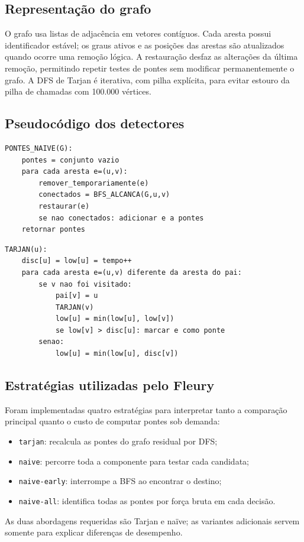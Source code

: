 \documentclass[12pt,a4paper]{article}
\begin{document}
\subsection{Representação do grafo}
O grafo usa listas de adjacência em vetores contíguos. Cada aresta
possui identificador estável; os graus ativos e as posições das arestas
são atualizados quando ocorre uma remoção lógica. A restauração desfaz
as alterações da última remoção, permitindo repetir testes de pontes
sem modificar permanentemente o grafo. A DFS de Tarjan é iterativa,
com pilha explícita, para evitar estouro da pilha de chamadas com
100.000 vértices.

\subsection{Pseudocódigo dos detectores}
\begin{lstlisting}[caption={Detecção de todas as pontes por força bruta.}]
PONTES_NAIVE(G):
    pontes = conjunto vazio
    para cada aresta e=(u,v):
        remover_temporariamente(e)
        conectados = BFS_ALCANCA(G,u,v)
        restaurar(e)
        se nao conectados: adicionar e a pontes
    retornar pontes
\end{lstlisting}

\begin{lstlisting}[caption={Regra de Tarjan em uma DFS; no Java a busca é iterativa.}]
TARJAN(u):
    disc[u] = low[u] = tempo++
    para cada aresta e=(u,v) diferente da aresta do pai:
        se v nao foi visitado:
            pai[v] = u
            TARJAN(v)
            low[u] = min(low[u], low[v])
            se low[v] > disc[u]: marcar e como ponte
        senao:
            low[u] = min(low[u], disc[v])
\end{lstlisting}

\subsection{Estratégias utilizadas pelo Fleury}
Foram implementadas quatro estratégias para interpretar tanto a comparação
principal quanto o custo de computar pontes sob demanda:
\begin{itemize}
\item \texttt{tarjan}: recalcula as pontes do grafo residual por DFS;
\item \texttt{naive}: percorre toda a componente para testar cada candidata;
\item \texttt{naive-early}: interrompe a BFS ao encontrar o destino;
\item \texttt{naive-all}: identifica todas as pontes por força bruta em cada decisão.
\end{itemize}
As duas abordagens requeridas são Tarjan e naïve; as variantes adicionais
servem somente para explicar diferenças de desempenho.
\end{document}
